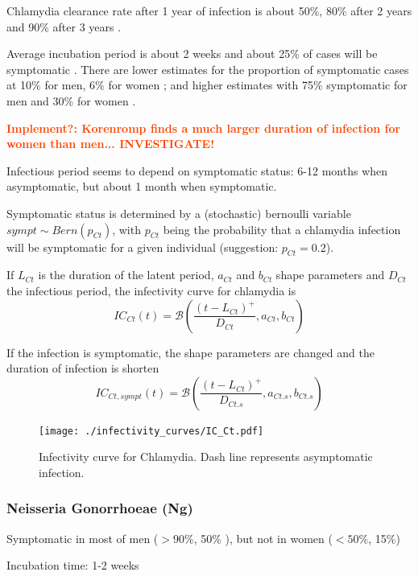 \documentclass[11pt, onecolumn]{article}
\newcommand{\warning}[1]{\textbf{\textcolor{OrangeRed}{#1}}}
\begin{document}
Chlamydia clearance rate after 1 year of infection is about 50\%, 80\% after 2 years and 90\% after 3 years \cite{Geisler:2010bc}.

Average incubation period is about 2 weeks and about 25\% of cases will be symptomatic \cite{Althaus:2011dc}. There are lower estimates for the proportion of symptomatic cases at 10\% for men, 6\% for women \cite{Korenromp:2002gt}; and higher estimates with 75\% symptomatic for men and 30\% for women \cite{Kretzschmar:1996ur}.

\warning{Implement?: Korenromp\cite{Korenromp:2002gt} finds a much larger duration of infection for women than men... INVESTIGATE!}

Infectious period seems to depend on symptomatic status: 6-12 months when asymptomatic, but about 1 month when symptomatic\cite{Kretzschmar:2009cd}.

Symptomatic status is determined by a (stochastic) bernoulli variable $sympt\sim Bern(p_{Ct})$, with $p_{Ct}$ being the probability that a chlamydia infection will be symptomatic for a given individual (suggestion: $p_{Ct}=0.2$).

If $L_{Ct}$ is the duration of the latent period, $a_{Ct}$ and $b_{Ct}$ shape parameters and $D_{Ct}$ the infectious period, the infectivity curve for chlamydia is
$$IC_{Ct}(t) = \mathcal{B}\left(\frac{(t-L_{Ct})^+}{D_{Ct}},a_{Ct},b_{Ct}\right)$$

If the infection is symptomatic, the shape parameters are changed and the duration of infection is shorten
$$IC_{Ct,sympt}(t) = \mathcal{B}\left(\frac{(t-L_{Ct})^+}{D_{Ct.s}},a_{Ct.s},b_{Ct.s}\right)$$

\begin{figure}[!ht]
\centering
    \texttt{[image: ./infectivity\_curves/IC\_Ct.pdf]}
\caption{Infectivity curve for Chlamydia. Dash line represents asymptomatic infection.}
\label{fig:ICCt}
\end{figure}



\subsubsection{Neisseria Gonorrhoeae (Ng)}

 Symptomatic in most of men ($> 90\%$\cite{Ison:2011eg,Kretzschmar:1996ur}, 50\%\cite{Korenromp:2002gt} ), but not in women ($< 50\%$\cite{Ison:2011eg,Kretzschmar:1996ur}, 15\%\cite{Korenromp:2002gt}) 
 
 Incubation time: 1-2 weeks\cite{Kretzschmar:1996ur}
 
\end{document}
